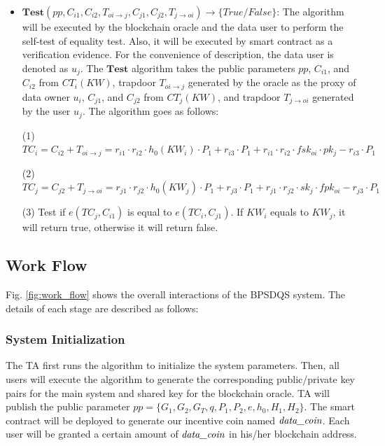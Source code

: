 \documentclass[journal]{IEEEtran}
\begin{document}
\begin{itemize}
    \item $ \boldsymbol{Test}(pp, C_{i1}, C_{i2}, T_{oi \to j}, C_{j1}, C_{j2}, T_{j \to oi}) \to \{True/False\} $: The algorithm will be executed by the blockchain oracle and the data user to perform the self-test of equality test. Also, it will be executed by smart contract as a verification evidence.
    For the convenience of description, the data user is denoted as $u_j$. The $\boldsymbol{Test}$ algorithm takes the public parameters $pp$, $C_{i1}$, and $C_{i2}$ from $CT_i(KW)$, trapdoor $T_{oi \to j}$ generated by the oracle as the proxy of data owner $u_i$, $C_{j1}$, and $C_{j2}$ from $CT_j(KW)$, and trapdoor $T_{j \to oi}$ generated by the user $u_j$.
    The algorithm goes as follows:
    
    (1) $TC_i = C_{i2} + T_{oi \to j} = r_{i1} \cdot r_{i2} \cdot h_0(KW_i) \cdot P_1 + r_{i3} \cdot P_1 + r_{i1} \cdot r_{i2} \cdot fsk_{oi} \cdot pk_j - r_{i3} \cdot P_1$
    
    (2) $TC_j = C_{j2} + T_{j \to oi} = r_{j1} \cdot r_{j2} \cdot h_0(KW_j) \cdot P_1 + r_{j3} \cdot P_1 + r_{j1} \cdot r_{j2} \cdot sk_{j} \cdot fpk_{oi} - r_{j3} \cdot P_1$
    
    (3) Test if $e(TC_j, C_{i1})$ is equal to $e(TC_i, C_{j1})$. If $KW_i$ equals to $KW_j$, it will return true, otherwise it will return false.
\end{itemize}

    \subsection{Work Flow}
    
    Fig. \ref{fig:work_flow} shows the overall interactions of the BPSDQS system. The details of each stage are described as follows:

    \subsubsection{\textbf{System Initialization}}
    
    The TA first runs the  algorithm to initialize the system parameters. Then, all users will execute the  algorithm to generate the corresponding public/private key pairs for the main system and shared key for the blockchain oracle. TA will publish the public parameter $pp = \{G_1, G_2, G_T, q, P_1, P_2, e, h_0, H_1, H_2\} $. The smart contract will be deployed to generate our incentive coin named $\emph{data\_coin}$. Each user will be granted a certain amount of $\emph{data\_coin}$ in his/her blockchain address.
\end{document}
